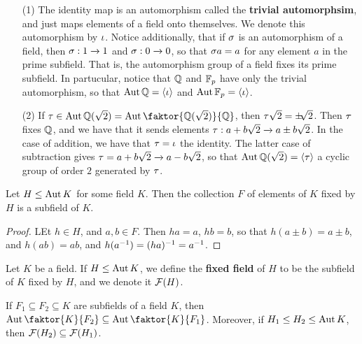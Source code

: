 \begin{example}\label{example_2.1}
    \begin{enumerate}
        \item[(1)] The identity map is an automorphism called the
            \textbf{trivial automorphsim}, and just maps elements of a field
            onto themselves. We denote this automorphism by $\iota$. Notice
            additionally, that if $\sigma$ is an automorphism of a field, then
            $\sigma:1 \xrightarrow{} 1$ and $\sigma:0 \xrightarrow{} 0$, so that $\sigma
            a=a$ for any element  $a$ in the prime subfield. That is, the
            automorphism group of a field fixes its prime subfield. In
            partucular, notice that $\mathbb{Q}$ and  $\mathbb{F}_p$ have only the trivial
            automorphism, so that  $\operatorname{Aut}{\mathbb{Q}}=\langle \iota \rangle$ and
            $\operatorname{Aut}{\mathbb{F}_p}=\langle \iota \rangle$.

        \item[(2)] If $\t \in
            \Aut{\Q(\sqrt{2})}=\Aut{\faktor{\Q(\sqrt{2})}{\Q}}$, then
            $\tau\sqrt{{2}}=\pm\sqrt[]{2}$. Then $\tau$ fixes $\mathbb{Q}$, and we have
            that it sends elements $\tau:a+b\sqrt{2} \xrightarrow{} a \pm
            b\sqrt{2}$. In the case of addition, we have that $\tau=\iota$ the
            identity. The latter case of subtraction gives  $\tau=a+b\sqrt{2}
            \xrightarrow{} a-b\sqrt{2}$, so that
            $\operatorname{Aut}{\mathbb{Q}(\sqrt{2})}=\langle \tau \rangle$ a cyclic group of order
            $2$ generated by  $\tau$.
    \end{enumerate}
\end{example}

\begin{proposition}\label{2.1.3}
    Let $H \leq \operatorname{Aut}{K}$ for some field $K$. Then the collection  $F$ of
    elements of  $K$ fixed by $H$ is a subfield of $K$.
\end{proposition}
\begin{proof}
    LEt $h \in H$, and $a,b \in F$. Then $ha=a$,  $hb=b$, so that  $h(a \pm b)=a
    \pm b$, and $h(ab)=ab$, and $h(a^{-1})=(ha)^{-1}=a^{-1}$.
\end{proof}

\begin{definition}
    Let $K$ be a field. If $H \leq \operatorname{Aut}{K}$, we define the \textbf{fixed field}
    of $H$ to be the subfield of $K$ fixed by  $H$, and we denote it  $\mathcal{F}(H)$.
\end{definition}

\begin{proposition}\label{2.1.4}
    If $F_1 \subseteq F_2 \subseteq K$ are subfields of a field $K$, then
    $\Aut{\faktor{K}{F_2}} \subseteq \Aut{\faktor{K}{F_1}}$. Moreover,
    if $H_1 \leq H_2 \leq \operatorname{Aut}{K}$, then $\mathcal{F}(H_2) \subseteq \mathcal{F}(H_1)$.
\end{proposition}

